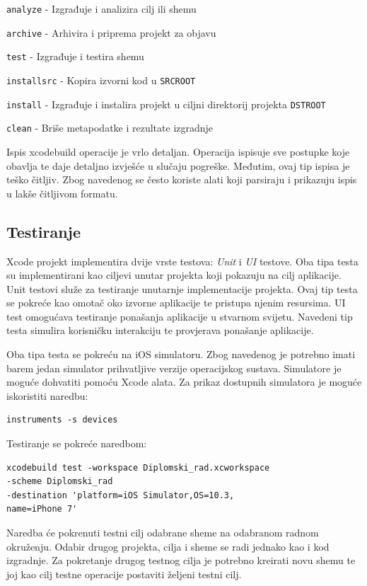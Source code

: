 \documentclass[times, utf8, diplomski, numeric]{fer}
\begin{document}
\begin{appendices}
\verb|analyze| - Izgrađuje i analizira cilj ili shemu

\verb|archive| - Arhivira i priprema projekt za objavu

\verb|test| - Izgrađuje i testira shemu

\verb|installsrc| - Kopira izvorni kod u \verb|SRCROOT|

\verb|install| - Izgrađuje i instalira projekt u ciljni direktorij projekta \verb|DSTROOT|

\verb|clean| - Briše metapodatke i rezultate izgradnje

Ispis xcodebuild operacije je vrlo detaljan. Operacija ispisuje sve postupke koje obavlja te daje detaljno izvješće u slučaju pogreške. Međutim, ovaj tip ispisa je teško čitljiv. Zbog navedenog se često koriste alati koji parsiraju i prikazuju ispis u lakše čitljivom formatu.

\subsection{Testiranje} \label{TestiranjeXcodeBuild}

Xcode projekt implementira dvije vrste testova: \textit{Unit} i \textit{UI} testove. Oba tipa testa su implementirani kao ciljevi unutar projekta koji pokazuju na cilj aplikacije. Unit testovi služe za testiranje unutarnje implementacije projekta. Ovaj tip testa se pokreće kao omotač oko izvorne aplikacije te pristupa njenim resursima. UI test omogućava testiranje ponašanja aplikacije u stvarnom svijetu. Navedeni tip testa simulira korisničku interakciju te provjerava ponašanje aplikacije.

Oba tipa testa se pokreću na iOS simulatoru. Zbog navedenog je potrebno imati barem jedan simulator prihvatljive verzije operacijskog sustava. Simulatore je moguće dohvatiti pomoću Xcode alata. Za prikaz dostupnih simulatora je moguće iskoristiti naredbu:

\begin{verbatim}
instruments -s devices
\end{verbatim}

Testiranje se pokreće naredbom:

\begin{verbatim}
xcodebuild test -workspace Diplomski_rad.xcworkspace
-scheme Diplomski_rad
-destination 'platform=iOS Simulator,OS=10.3,
name=iPhone 7'
\end{verbatim}

Naredba će pokrenuti testni cilj odabrane sheme na odabranom radnom okruženju. Odabir drugog projekta, cilja i sheme se radi jednako kao i kod izgradnje. Za pokretanje drugog testnog cilja je potrebno kreirati novu shemu te joj kao cilj testne operacije postaviti željeni testni cilj.


\end{appendices}
\end{document}
